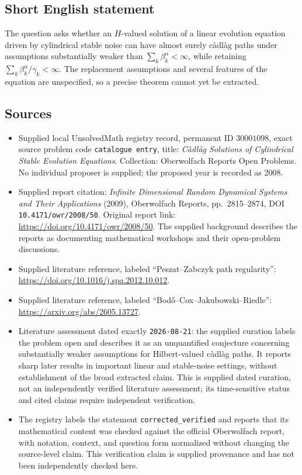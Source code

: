 \documentclass[11pt]{article}
\begin{document}
\subsection{Short English statement}
The question asks whether an \(H\)-valued solution of a linear evolution equation driven by cylindrical stable noise can have almost surely c\`adl\`ag paths under assumptions substantially weaker than \(\sum_k\beta_k^{\alpha}<\infty\), while retaining \(\sum_k\beta_k^{\alpha}/\gamma_k<\infty\). The replacement assumptions and several features of the equation are unspecified, so a precise theorem cannot yet be extracted.
\subsection{Sources}
\begin{itemize}
\item Supplied local UnsolvedMath registry record, permanent ID \(30001098\), exact source problem code \texttt{catalogue entry}, title: \emph{C\`adl\`ag Solutions of Cylindrical Stable Evolution Equations}. Collection: Oberwolfach Reports Open Problems. No individual proposer is supplied; the proposed year is recorded as 2008.
\item Supplied report citation: \emph{Infinite Dimensional Random Dynamical Systems and Their Applications} (2009), Oberwolfach Reports, pp.\ 2815--2874, DOI \texttt{10.4171/owr/2008/50}. Original report link: \url{https://doi.org/10.4171/owr/2008/50}. The supplied background describes the reports as documenting mathematical workshops and their open-problem discussions.
\item Supplied literature reference, labeled ``Peszat--Zabczyk path regularity'': \url{https://doi.org/10.1016/j.spa.2012.10.012}.
\item Supplied literature reference, labeled ``Bod\H{o}--Cox--Jakubowski--Riedle'': \url{https://arxiv.org/abs/2605.13727}.
\item Literature assessment dated exactly \texttt{2026-08-21}: the supplied curation labels the problem open and describes it as an unquantified conjecture concerning substantially weaker assumptions for Hilbert-valued c\`adl\`ag paths. It reports sharp later results in important linear and stable-noise settings, without establishment of the broad extracted claim. This is supplied dated curation, not an independently verified literature assessment; its time-sensitive status and cited claims require independent verification.
\item The registry labels the statement \texttt{corrected\_verified} and reports that its mathematical content was checked against the official Oberwolfach report, with notation, context, and question form normalized without changing the source-level claim. This verification claim is supplied provenance and has not been independently checked here.
\end{itemize}
\end{document}
